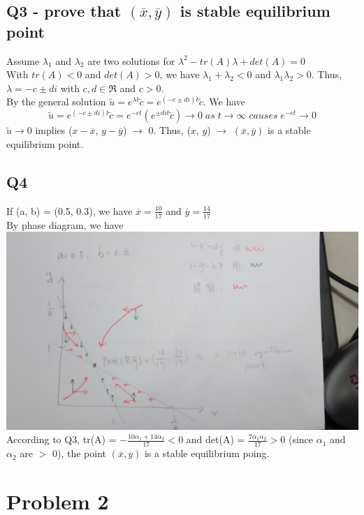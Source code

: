 \documentclass [12pt] {article}
\begin{document}
	\subsection {Q3 - prove that $(\overline{x}, \overline{y})$ is stable equilibrium point}
	Assume $\lambda_1$ and $\lambda_2$ are two solutions for $\lambda^2 - tr(A)\lambda+det(A) = 0$\\
	With $tr(A) < 0$ and $det(A) > 0$, we have $\lambda_1+\lambda_2 < 0$ and $\lambda_1\lambda_2 > 0$. Thus, $\lambda = -c \pm di$ with $c, d \in \Re$ and $c > 0.$\\
	By the general solution $\widetilde{u} = e^{\lambda t}\widetilde{c} = e^{(-c\pm di)t}\widetilde{c}$. We have
	\[\widetilde{u} = e^{(-c\pm di)t}\widetilde{c} = e^{-ct}(e^{\pm dit}\widetilde{c}) \rightarrow 0 \;as \;t \rightarrow \infty \;causes \;e^{-ct}\rightarrow 0\]
	$\widetilde{u} \rightarrow 0$ implies ($x-\overline{x}$, $y-\overline{y}$) $\rightarrow$ 0. Thus, ($x$, $y$) $\rightarrow$ $(\overline{x}, \overline{y})$ is a stable equilibrium point.
	\subsection {Q4}
	If (a, b) = (0.5, 0.3), we have $\overline{x} = \frac{10}{17}$ and $\overline{y} = \frac{14}{17}$\\
	By phase diagram, we have\\
	\includegraphics [width=\linewidth]{fig1}
	According to Q3, tr(A) = $-\frac{10\alpha_1+14\alpha_2}{17} < 0$ and det(A) = $\frac{7\alpha_1\alpha_2}{17} > 0$ (since $\alpha_1$ and $\alpha_2$ are $>$ 0), the point $(\overline{x}, \overline{y})$ is a stable equilibrium poing.

	\section {Problem 2}
\end{document}
